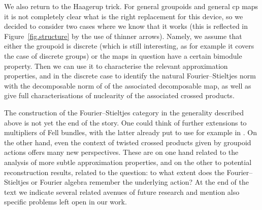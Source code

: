 \documentclass[11 pt, leqno]{amsart}
\numberwithin{equation}{section}
\theoremstyle{plain}
\theoremstyle{definition}
\begin{document}
We also return to the Haagerup trick. 
For general groupoids and general cp maps it is not completely clear what is the right replacement for this device, so we decided to consider two cases where we know that it works (this is reflected in Figure~\ref{fig.structure} by the use of thinner arrows). 
Namely, we assume that either the groupoid is discrete (which is still interesting, as for example it covers the case of discrete groups) or the maps in question have a certain bimodule property. 
Then we can use it to characterise the relevant approximation properties, and in the discrete case to identify the natural Fourier--Stieltjes norm with the decomposable norm of \cite{Haagerupdec} of the associated decomposable map, as well as give full characterisations of nuclearity of the associated crossed products. 


The construction of the Fourier--Stieltjes category in the generality described above is not yet the end of the story. 
One could think of further extensions to multipliers of Fell bundles, with the latter already put to use for example in \cite{Exel:amenability,BussMartinez}. 
On the other hand, even the context of twisted crossed products given by groupoid actions offers many new perspectives. 
These are on one hand related to the analysis of more subtle approximation properties, and on the other to potential reconstruction results, related to the question: to what extent does the Fourier--Stieltjes or Fourier algebra remember the underlying action? 
At the end of the text we indicate several related avenues of future research and mention also specific problems left open in our work.
\end{document}
